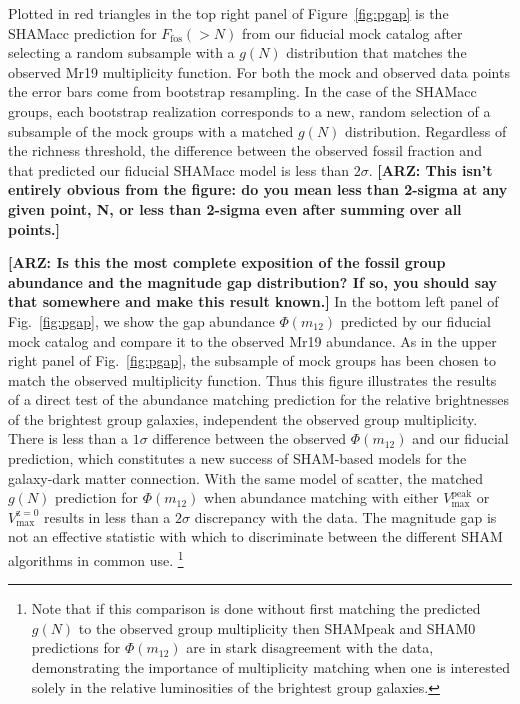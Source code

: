 \documentclass[usenatbib,usegraphicx,letterpaper]{mn2e}
\newcommand{\monetwo}{m_{12}}
\newcommand{\ffos}{F_{\mathrm{fos}}}
\newcommand{\vpeak}{V_{\mathrm{max}}^{\mathrm{peak}}}
\newcommand{\vzero}{V_{\mathrm{max}}^{\mathrm{z=0}}}
\begin{document}
Plotted in red triangles in the top right panel of Figure~\ref{fig:pgap} 
is the SHAMacc prediction for $\ffos(>N)$ from our fiducial mock catalog after 
selecting a random subsample with a $g(N)$ distribution that matches the observed 
Mr19 multiplicity function. For both the mock and observed data points the error bars 
come from bootstrap resampling. In the case of the SHAMacc groups, each bootstrap 
realization corresponds to a new, random selection of a subsample of the mock groups 
with a matched $g(N)$ distribution. Regardless of the richness threshold, the difference 
between the observed fossil fraction and that predicted our fiducial SHAMacc model is less than 
$2\sigma$. {\bf [ARZ: This isn't entirely obvious from the figure: do you mean less 
than 2-sigma at any given point, N, or less than 2-sigma even after summing over 
all points.]}


{\bf [ARZ: Is this the most complete exposition of the fossil group abundance 
and the magnitude gap distribution?  If so, you should say that somewhere 
and make this result known.]}
In the bottom left panel of Fig.~\ref{fig:pgap}, we show the gap abundance $\Phi(\monetwo)$ predicted by 
our fiducial mock catalog and compare it to the observed Mr19 abundance. 
As in the upper right panel of Fig.~\ref{fig:pgap}, the subsample of mock groups 
has been chosen to match the observed multiplicity function. Thus this figure illustrates 
the results of a direct test of the abundance matching prediction for the relative 
brightnesses of the brightest group galaxies, independent the observed group multiplicity. 
There is less than a $1\sigma$ difference between the observed $\Phi(\monetwo)$ and our 
fiducial prediction, which constitutes a new success of SHAM-based models for the 
galaxy-dark matter connection. With the same model of scatter, the matched $g(N)$ 
prediction for $\Phi(\monetwo)$ when abundance matching with either $\vpeak$ or $\vzero$ 
results in less than a $2\sigma$ discrepancy with the data.  The magnitude 
gap is not an effective statistic with which to discriminate between the 
different SHAM algorithms in common use.  
\footnote{Note that if this comparison is done without first matching the 
predicted $g(N)$ to the observed group multiplicity then SHAMpeak and SHAM0 
predictions for $\Phi(\monetwo)$ are in stark disagreement with the data, 
demonstrating the importance of multiplicity matching when one is interested 
solely in the relative luminosities of the brightest group galaxies.}   
\end{document}
